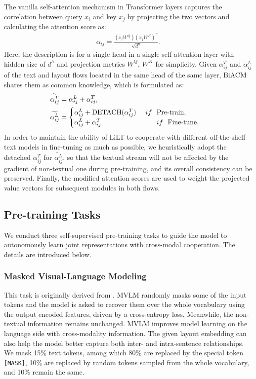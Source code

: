 \documentclass[11pt]{article}
\begin{document}
The vanilla self-attention mechanism in Transformer layers  captures the correlation between query $x_i$ and key $x_j$ by projecting the two vectors and calculating the attention score  as:
\begin{align}
    \alpha_{ij}=\frac{{(x_iW^Q)(x_jW^K)}^\top}{\sqrt{d^{h}}}.
\end{align} 
Here, the description is for a single head in a single self-attention layer with hidden size of $d^h$ and projection metrics $W^Q$, $W^K$ for simplicity. 
Given $\alpha^{T}_{ij}$ and $\alpha^{L}_{ij}$ of the text and layout flows located in the same head of the same layer, BiACM shares them as  common knowledge,  which is  formulated as:
\begin{align}
&\widetilde{\alpha^{T}_{ij}}=\alpha^{L}_{ij}+\alpha^{T}_{ij}, \\
&\widetilde{\alpha^{L}_{ij}}=
\begin{cases}
\alpha^{L}_{ij}+\mathrm{DETACH}(\alpha^{T}_{ij}) \ \ \ \normalsize{\text{ $if \ $ $\mathrm{Pre}$-$\mathrm{train}$},}\\
\alpha^{L}_{ij}+\alpha^{T}_{ij}  \ \ \ \ \ \ \ \ \ \ \ \ \ \ \ \ \ \ \ \ \ \ \ \normalsize{\text{ $if \ $ $\mathrm{Fine}$-$\mathrm{tune}$}.}
\end{cases}
\label{detach}
\end{align}
In order to maintain the ability of LiLT to cooperate with different off-the-shelf text models in fine-tuning  as much as possible, we heuristically adopt the detached $\alpha^{T}_{ij}$ for $\widetilde{\alpha^{L}_{ij}}$, so that the  textual stream  will not be affected by the gradient of  non-textual one during pre-training, and its overall consistency can be preserved. Finally, the modified attention scores are used to weight the projected value vectors for subsequent modules in both flows.

\subsection{Pre-training Tasks}
We conduct three self-supervised pre-training tasks to guide the model   to autonomously  learn  joint representations with  cross-modal cooperation. The details are introduced below.
\subsubsection{Masked Visual-Language Modeling}
This task is originally derived from  \cite{devlin2019bert}.
MVLM randomly masks some of the input tokens and the model is asked to recover them  over the whole vocabulary using the output encoded features, driven by a cross-entropy loss. 
Meanwhile, the non-textual information remains unchanged. MVLM improves model learning on the language side with cross-modality information. The given layout embedding can also help the model better capture both inter- and intra-sentence relationships. We mask 15\% text tokens, among which 80\% are replaced by the special token \texttt{[MASK]}, 10\% are replaced by  random tokens sampled from the whole vocabulary, and 10\% remain the same.
\end{document}
